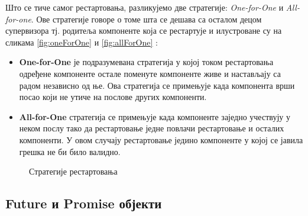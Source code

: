 \documentclass[12pt,oneside]{memoir}
\begin{document}
Што се тиче самог рестартовања, разликујемо две стратегије: \textit{One-for-One} и \textit{All-for-one}. Ове стратегије говоре о томе шта се дешава са осталом децом супервизора тј. родитеља компоненте која се рестартује и илустроване су на сликама \ref{fig:oneForOne} и \ref{fig:allForOne} \cite{progInScala3, akkaDoc}:
\begin{itemize}
\item \textbf{One-for-One} је подразумевана стратегија у којој током рестартовања одређене компоненте остале поменуте компоненте живе и настављају са радом независно од ње. Ова стратегија се примењује када компонента врши посао који не утиче на послове других компоненти.
\item \textbf{All-for-One} стратегија се примењује када компоненте заједно учествују у неком послу тако да рестартовање једне повлачи рестартовање и осталих компоненти. У овом случају рестартовање једино компоненте у којој се јавила грешка не би било валидно.
\end{itemize}

\begin{figure}[!tbp]
  \centering
  \hfill
  \caption{Стратегије рестартовања}
\end{figure}

\subsection{Future и Promise објекти}
\label{subsec:futPro}


\end{document}
